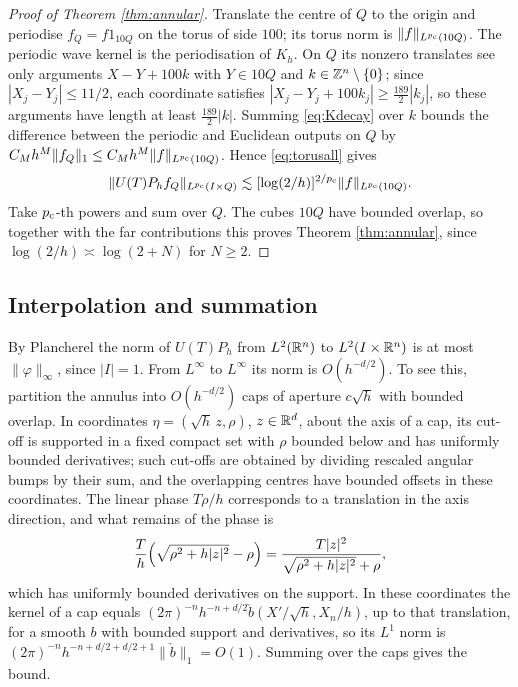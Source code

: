 \begin{proof}[Proof of Theorem \ref{thm:annular}]
Translate the centre of $Q$ to the origin and periodise $f_Q=f1_{10Q}$ on the torus of side $100$;
its torus norm is $\|f\|_{L^{p_{\mathrm c}}(10Q)}$. The periodic wave kernel is the periodisation of $K_h$. On
$Q$ its nonzero translates see only arguments $X-Y+100k$ with $Y\in10Q$ and $k\in\mathbb{Z}^n\setminus\{0\}$;
since $|X_j-Y_j|\le11/2$, each coordinate satisfies $|X_j-Y_j+100k_j|\ge\frac{189}2|k_j|$, so these
arguments have length at least $\frac{189}2|k|$. Summing \eqref{eq:Kdecay} over $k$ bounds the
difference between the periodic and Euclidean outputs on $Q$ by $C_Mh^M\|f_Q\|_1\le C_Mh^M\|f\|_{L^{p_{\mathrm c}}(10Q)}$.
Hence \eqref{eq:torusall} gives
\[
\|U(T)P_hf_Q\|_{L^{p_{\mathrm c}}(I\times Q)}\lesssim[\log(2/h)]^{2/p_{\mathrm c}}\|f\|_{L^{p_{\mathrm c}}(10Q)} .
\]
Take $p_{\mathrm c}$-th powers and sum over $Q$. The cubes $10Q$ have bounded overlap, so together with the
far contributions this proves Theorem \ref{thm:annular}, since $\log(2/h)\asymp\log(2+N)$ for
$N\ge2$.
\end{proof}

\subsection{Interpolation and summation}\label{ssec:interp}
By Plancherel the norm of $U(T)P_h$ from $L^2(\mathbb{R}^n)$ to $L^2(I\times\mathbb{R}^n)$ is at most
$\|\varphi\|_\infty$, since $|I|=1$. From $L^\infty$ to $L^\infty$ its norm is $O(h^{-d/2})$. To see
this, partition the annulus into $O(h^{-d/2})$ caps of aperture $c\sqrt h$ with bounded overlap. In
coordinates $\eta=(\sqrt h\,z,\rho)$, $z\in\mathbb{R}^d$, about the axis of a cap, its cut-off is supported in
a fixed compact set with $\rho$ bounded below and has uniformly bounded derivatives; such cut-offs
are obtained by dividing rescaled angular bumps by their sum, and the overlapping centres have
bounded offsets in these coordinates. The linear phase $T\rho/h$ corresponds to a translation in
the axis direction, and what remains of the phase is
\[
\frac Th\Bigl(\sqrt{\rho^2+h|z|^2}-\rho\Bigr)=\frac{T|z|^2}{\sqrt{\rho^2+h|z|^2}+\rho},
\]
which has uniformly bounded derivatives on the support. In these coordinates the kernel of a
cap equals $(2\pi)^{-n}h^{-n+d/2}\check b(X'/\sqrt h,X_n/h)$, up to that translation, for a smooth
$b$ with bounded support and derivatives, so its $L^1$ norm is
$(2\pi)^{-n}h^{-n+d/2+d/2+1}\|\check b\|_1=O(1)$. Summing over the caps gives the bound.


